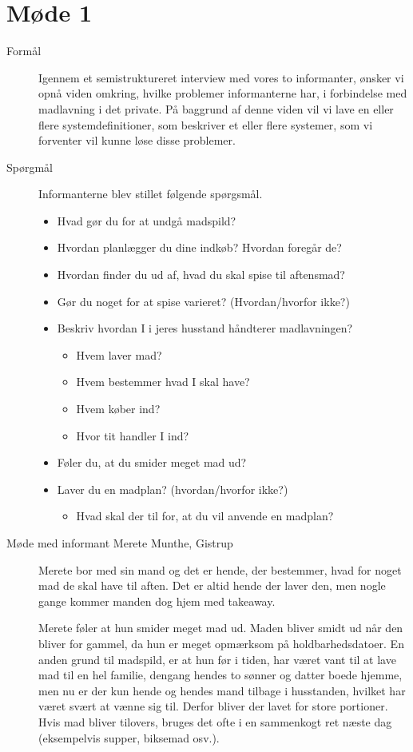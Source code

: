 \section{Møde 1}
\begin{description}
\item[Formål] Igennem et semistruktureret interview med vores to informanter, ønsker vi opnå viden omkring, hvilke problemer informanterne har, i forbindelse med madlavning i det private. På baggrund af denne viden vil vi lave en eller flere systemdefinitioner, som beskriver et eller flere systemer, som vi forventer vil kunne løse disse problemer.

\item[Spørgmål] Informanterne blev stillet følgende spørgsmål.

\begin{itemize}[noitemsep]
\item Hvad gør du for at undgå madspild?
\item Hvordan planlægger du dine indkøb? Hvordan foregår de?
\item Hvordan finder du ud af, hvad du skal spise til aftensmad?
\item Gør du noget for at spise varieret? (Hvordan/hvorfor ikke?)
\item Beskriv hvordan I i jeres husstand håndterer madlavningen?
\begin{itemize}[noitemsep]
\item Hvem laver mad?
\item Hvem bestemmer hvad I skal have?
\item Hvem køber ind?
\item Hvor tit handler I ind?
\end{itemize}
\item Føler du, at du smider meget mad ud?
\item Laver du en madplan? (hvordan/hvorfor ikke?)
\begin{itemize}[noitemsep]
\item Hvad skal der til for, at du vil anvende en madplan?
\end{itemize}
\end{itemize}

\item[Møde med informant Merete Munthe, Gistrup]
Merete bor med sin mand og det er hende, der bestemmer, hvad for noget mad de skal have til aften. Det er altid hende der laver den, men nogle gange kommer manden dog hjem med takeaway.

Merete føler at hun smider meget mad ud. Maden bliver smidt ud når den bliver for gammel, da hun er meget opmærksom på holdbarhedsdatoer. En anden grund til madspild, er at hun før i tiden, har været vant til at lave mad til en hel familie, dengang hendes to sønner og datter boede hjemme, men nu er der kun hende og hendes mand tilbage i husstanden, hvilket har været svært at vænne sig til. Derfor bliver der lavet for store portioner. Hvis mad bliver tilovers, bruges det ofte i en sammenkogt ret næste dag (eksempelvis supper, biksemad osv.).


\end{description}
